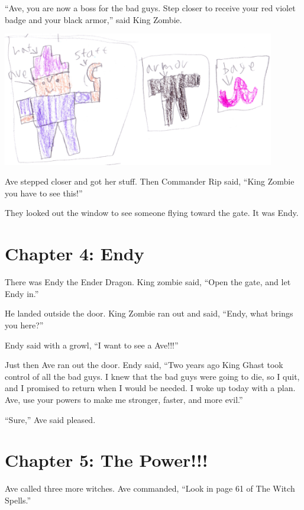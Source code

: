 \documentclass[12pt,oneside]{krantz}
\begin{document}
``Ave, you are now a boss for the bad guys. Step closer to receive your
red violet badge and your black armor,'' said King Zombie.

\includegraphics[width=4.6875in,height=\textheight]{img/avestuff.jpg}

Ave stepped closer and got her stuff. Then Commander Rip said, ``King
Zombie you have to see this!''

They looked out the window to see someone flying toward the gate. It was
Endy.

\hypertarget{chapter-4-endy}{%
\chapter*{Chapter 4: Endy}\label{chapter-4-endy}}


There was Endy the Ender Dragon. King zombie said, ``Open the gate, and
let Endy in.''

He landed outside the door. King Zombie ran out and said, ``Endy, what
brings you here?''

Endy said with a growl, ``I want to see a Ave!!!''

Just then Ave ran out the door. Endy said, ``Two years ago King Ghast
took control of all the bad guys. I knew that the bad guys were going to
die, so I quit, and I promised to return when I would be needed. I woke
up today with a plan. Ave, use your powers to make me stronger, faster,
and more evil.''

``Sure,'' Ave said pleased.

\hypertarget{chapter-5-the-power}{%
\chapter*{Chapter 5: The Power!!!}\label{chapter-5-the-power}}


Ave called three more witches. Ave commanded, ``Look in page 61 of The
Witch Spells.''
\end{document}
